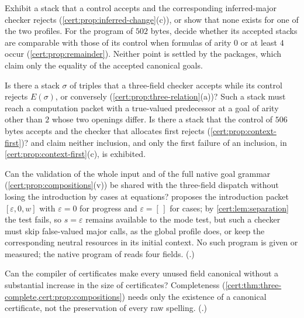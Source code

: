\begin{question}
Exhibit a stack that a control accepts and the corresponding inferred-major
checker rejects (\cref{cert:prop:inferred-change}(c)), or show that none
exists for one of the two profiles. For the program of $502$ bytes, decide
whether its accepted stacks are comparable with those of its control when
formulas of arity $0$ or at least $4$ occur (\cref{cert:prop:remainder}).
Neither point is settled by the packages, which claim only the equality of
the accepted canonical goals.
\end{question}

\begin{question}
Is there a stack $\sigma$ of triples that a three-field checker accepts while
its control rejects $E(\sigma)$, or conversely
(\cref{cert:prop:three-relation}(a))? Such a stack must reach a computation
packet with a true-valued predecessor at a goal of arity other than $2$ whose
two openings differ. Is there a stack that the control of $506$ bytes accepts
and the checker that allocates first rejects
(\cref{cert:prop:context-first})?  and 
claim neither inclusion, and only the first failure of an inclusion, in
\cref{cert:prop:context-first}(c), is exhibited.
\end{question}

\begin{question}
Can the validation of the whole input and of the full native goal grammar
(\cref{cert:prop:compositions}(v)) be shared with the three-field dispatch
without losing the introduction by cases at equations? 
proposes the introduction packet $[\varepsilon,0,w]$ with $\varepsilon=0$ for
progress and $\varepsilon=[\,]$ for cases; by \cref{cert:lem:separation} the
test fails, so $s=\varepsilon$ remains available to the mode test, but such a
checker must skip false-valued major calls, as the global profile does, or
keep the corresponding neutral resources in its initial context. No such
program is given or measured; the native program of  reads
four fields. (.)
\end{question}

\begin{question}
Can the compiler of certificates make every unused field canonical without a
substantial increase in the size of certificates? Completeness
(\cref{cert:thm:three-complete,cert:prop:compositions}) needs only the
existence of a canonical certificate, not the preservation of every raw
spelling. (.)
\end{question}

